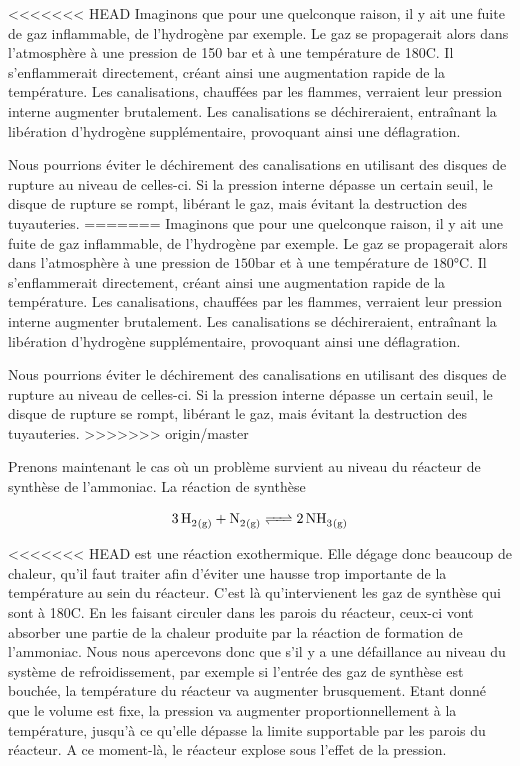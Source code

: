 \documentclass[a4paper,oneside,12pt]{article}
\begin{document}
<<<<<<< HEAD
Imaginons que pour une quelconque raison, il y ait une fuite de gaz inflammable, de l'hydrogène par exemple. 
Le gaz se propagerait alors dans l'atmosphère à une pression de 150 bar et à une température de 180{\degre}C. 
Il s'enflammerait directement, créant ainsi une augmentation rapide de la température.
Les canalisations, chauffées par les flammes, verraient leur pression interne augmenter brutalement. 
Les canalisations se déchireraient, entraînant la libération d'hydrogène supplémentaire, provoquant ainsi une déflagration.

Nous pourrions éviter le déchirement des canalisations en utilisant des disques de rupture au niveau de celles-ci. 
Si la pression interne dépasse un certain seuil, le disque de rupture se rompt, libérant le gaz, mais évitant la destruction des tuyauteries.
\newline
=======
Imaginons que pour une quelconque raison, il y ait une fuite de gaz inflammable, 
de l'hydrogène par exemple. Le gaz se propagerait alors dans l'atmosphère à 
une pression de $150\si{\bar}$ et à une température de $180\si{\celsius}$. 
Il s'enflammerait directement, créant ainsi une augmentation rapide de la température. 
Les canalisations, chauffées par les flammes, verraient leur pression interne augmenter 
brutalement. Les canalisations se déchireraient, entraînant la libération d'hydrogène 
supplémentaire, provoquant ainsi une déflagration.

Nous pourrions éviter le déchirement des canalisations en utilisant des disques de rupture 
au niveau de celles-ci. Si la pression interne dépasse un certain seuil, le disque de rupture 
se rompt, libérant le gaz, mais évitant la destruction des tuyauteries.
>>>>>>> origin/master

Prenons maintenant le cas où un problème survient au niveau du réacteur de synthèse 
de l'ammoniac. La réaction de synthèse

\begin{equation*}
	\ce{3 \, H2_{(g)} + N2_{(g)} <=> {2} \, NH3_{(g)}} 
\end{equation*}

<<<<<<< HEAD
est une réaction exothermique. Elle dégage donc beaucoup de chaleur, qu'il faut traiter afin d'éviter une hausse trop importante de la température au sein du réacteur. 
C'est là qu'intervienent les gaz de synthèse  qui sont à 180{\degre}C. 
En les faisant circuler dans les parois du réacteur, ceux-ci vont absorber une partie de la chaleur produite par la réaction de formation de l'ammoniac. 
Nous nous apercevons donc que s'il y a une défaillance au niveau du système de refroidissement, par exemple si l'entrée des gaz de synthèse est bouchée, la température du réacteur va augmenter brusquement. 
Etant donné que le volume est fixe, la pression va augmenter proportionnellement à la température, jusqu'à ce qu'elle dépasse la limite supportable par les parois du réacteur. 
A ce moment-là, le réacteur explose sous l'effet de la pression.
\newline
\end{document}
